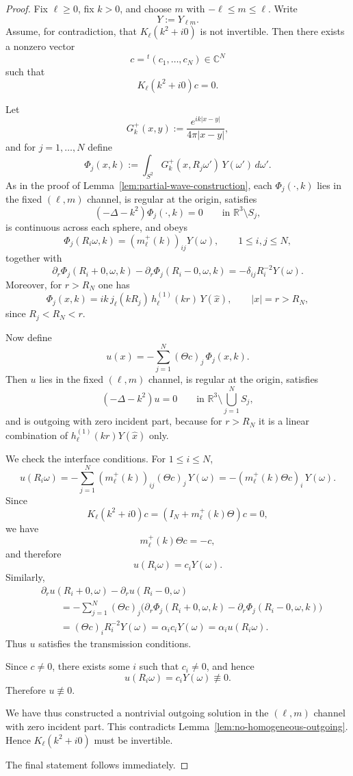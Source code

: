 \documentclass[a4paper,11pt]{article}
\numberwithin{equation}{section}
\newcommand{\R}{\mathbb{R}}
\newcommand{\C}{\mathbb{C}}
\theoremstyle{definition}
\theoremstyle{remark}
\begin{document}
\begin{proof}
Fix $\ell\ge0$, fix $k>0$, and choose $m$ with $-\ell\le m\le\ell$.
Write
\[
Y:=Y_{\ell m}.
\]
Assume, for contradiction, that $K_\ell(k^2+i0)$ is not invertible.
Then there exists a nonzero vector
\[
c={}^t(c_1,\ldots,c_N)\in\C^N
\]
such that
\[
K_\ell(k^2+i0)c=0.
\]

Let
\[
G_k^+(x,y):=\frac{e^{ik|x-y|}}{4\pi|x-y|},
\]
and for $j=1,\ldots,N$ define
\[
\Phi_j(x,k)
:=
\int_{S^2}G_k^+(x,R_j\omega')\,Y(\omega')\,d\omega'.
\]
As in the proof of Lemma~\ref{lem:partial-wave-construction}, each
$\Phi_j(\cdot,k)$ lies in the fixed $(\ell,m)$ channel, is regular at the
origin, satisfies
\[
(-\Delta-k^2)\Phi_j(\cdot,k)=0
\qquad
\text{in }\R^3\setminus S_j,
\]
is continuous across each sphere, and obeys
\[
\Phi_j(R_i\omega,k)
=
(m_\ell^+(k))_{ij}Y(\omega),
\qquad
1\le i,j\le N,
\]
together with
\[
\partial_r\Phi_j(R_i+0,\omega,k)-\partial_r\Phi_j(R_i-0,\omega,k)
=
-\delta_{ij}R_i^{-2}Y(\omega).
\]
Moreover, for $r>R_N$ one has
\[
\Phi_j(x,k)
=
ik\,j_\ell(kR_j)\,h_\ell^{(1)}(kr)\,Y(\widehat x),
\qquad |x|=r>R_N,
\]
since $R_j<R_N<r$.

Now define
\[
u(x)
=
-\sum_{j=1}^N (\Theta c)_j\,\Phi_j(x,k).
\]
Then $u$ lies in the fixed $(\ell,m)$ channel, is regular at the origin,
satisfies
\[
(-\Delta-k^2)u=0
\qquad
\text{in }\R^3\setminus\bigcup_{j=1}^N S_j,
\]
and is outgoing with zero incident part, because for $r>R_N$ it is a linear
combination of $h_\ell^{(1)}(kr)Y(\widehat x)$ only.

We check the interface conditions. For $1\le i\le N$,
\[
u(R_i\omega)
=
-\sum_{j=1}^N (m_\ell^+(k))_{ij}(\Theta c)_j\,Y(\omega)
=
-(m_\ell^+(k)\Theta c)_i\,Y(\omega).
\]
Since
\[
K_\ell(k^2+i0)c
=
(I_N+m_\ell^+(k)\Theta)c
=
0,
\]
we have
\[
m_\ell^+(k)\Theta c=-c,
\]
and therefore
\[
u(R_i\omega)=c_iY(\omega).
\]
Similarly,
\begin{align*}
&\partial_r u(R_i+0,\omega)-\partial_r u(R_i-0,\omega)
\\
&\qquad
=
-\sum_{j=1}^N (\Theta c)_j
\bigl(
\partial_r\Phi_j(R_i+0,\omega,k)-\partial_r\Phi_j(R_i-0,\omega,k)
\bigr)
\\
&\qquad
=
(\Theta c)_iR_i^{-2}Y(\omega)
=
\alpha_i c_iY(\omega)
=
\alpha_i u(R_i\omega).
\end{align*}
Thus $u$ satisfies the transmission conditions.

Since $c\neq0$, there exists some $i$ such that $c_i\neq0$, and hence
\[
u(R_i\omega)=c_iY(\omega)\not\equiv0.
\]
Therefore $u\not\equiv0$.

We have thus constructed a nontrivial outgoing solution in the
$(\ell,m)$ channel with zero incident part. This contradicts
Lemma~\ref{lem:no-homogeneous-outgoing}. Hence
$K_\ell(k^2+i0)$ must be invertible.

The final statement follows immediately.
\end{proof}
\end{document}
